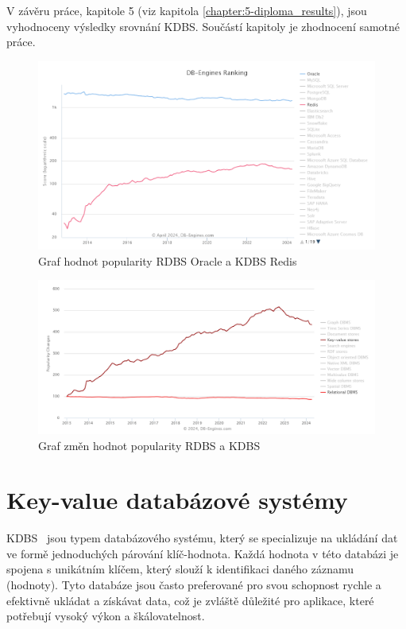 \documentclass[czech,master,dept460,male,csharp,cpdeclaration]{diploma}
\begin{document}
	V závěru práce, kapitole 5 (viz kapitola \ref{chapter:5-diploma_results}), jsou vyhodnoceny výsledky srovnání KDBS. Součástí kapitoly je zhodnocení samotné práce.
	
	\begin{figure}[h]
		\centering
		\includegraphics[scale=0.65]{Data/db-engine-trend-dbs.PNG}
		\caption{Graf hodnot popularity RDBS Oracle a KDBS Redis
		\cite{dbranking-trend-by-dbs}\label{graf-dbranking-trend-dbs}}
	\end{figure}

	\begin{figure}[h]
		\centering
		\includegraphics[scale=0.65]{Data/db-engine-trend-model.PNG}
		\caption{Graf změn hodnot popularity RDBS a KDBS \cite{dbranking-trend-by-model}\label{graf-dbranking-trend-model}}
	\end{figure}
	
	\chapter{Key-value databázové systémy\label{chapter:no-sql-ky-sys}}
	
	KDBS~\cite{amaz-key-value-db, ytb-nosql-db, kdbs-oracle, kdbs-redis} jsou typem databázového systému, který se specializuje na ukládání dat ve formě jednoduchých párování klíč-hodnota. Každá hodnota v této databázi je spojena s unikátním klíčem, který slouží k identifikaci daného záznamu (hodnoty). Tyto databáze jsou často preferované pro svou schopnost rychle a efektivně ukládat a získávat data, což je zvláště důležité pro aplikace, které potřebují vysoký výkon a škálovatelnost.
	
\end{document}
